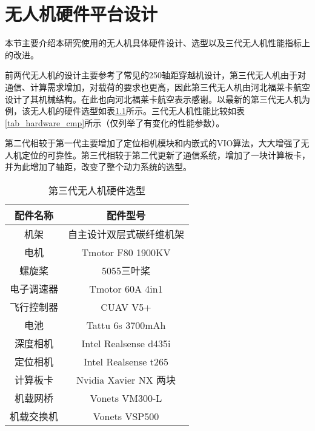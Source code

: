 
\chapter{无人机硬件平台设计}
\label{app1}
本节主要介绍本研究使用的无人机具体硬件设计、选型以及三代无人机性能指标上的改进。

前两代无人机的设计主要参考了常见的250轴距穿越机设计\cite{zhou2020ego}，第三代无人机由于对通信、计算需求增加，对载荷的要求也更高，因此第三代无人机由河北福莱卡航空设计了其机械结构。在此也向河北福莱卡航空表示感谢。以最新的第三代无人机为例，该无人机的硬件选型如表\ref{tab_hardware}所示。三代无人机性能比较如表\ref{tab_hardware_cmp}所示（仅列举了有变化的性能参数）。

第二代相较于第一代主要增加了定位相机模块和内嵌式的VIO算法，大大增强了无人机定位的可靠性。第三代相较于第二代更新了通信系统，增加了一块计算板卡，并为此增加了轴距，改变了整个动力系统的选型。

\begin{table}
    \centering
    \begin{tabular}{cc}
    \hline
        配件名称 & 配件型号 \\ \hline
        机架 & 自主设计双层式碳纤维机架 \\ 
        电机 & Tmotor F80 1900KV \\ 
        螺旋桨 & 5055三叶桨 \\ 
        电子调速器 & Tmotor 60A 4in1 \\ 
        飞行控制器 & CUAV V5+ \\ 
        电池 & Tattu 6s 3700mAh \\ 
        深度相机 & Intel Realsense d435i \\ 
        定位相机 & Intel Realsense t265 \\ 
        计算板卡 & Nvidia Xavier NX 两块 \\ 
        机载网桥 & Vonets VM300-L \\ 
        机载交换机 & Vonets VSP500 \\ \hline
    \end{tabular}
    \caption{第三代无人机硬件选型}
    \label{tab_hardware}
\end{table}

